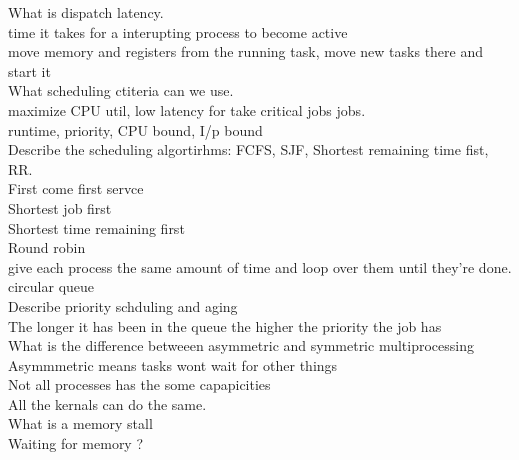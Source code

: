 \documentclass[a4paper,10pt,titlepage]{report}
\begin{document}
What is dispatch latency.\\
\hspace{10mm} time it takes for a interupting process to become active \\
\hspace{10mm} move memory and registers from the running task, move new tasks there and start it \\


What scheduling ctiteria can we use.\\
\hspace{10mm} maximize CPU util, low latency for take critical jobs jobs.\\
\hspace{10mm} runtime, priority, CPU bound, I/p bound \\


Describe the scheduling algortirhms: FCFS, SJF, Shortest remaining time fist, RR.\\
\hspace{10mm} First come first servce\\
\hspace{10mm} Shortest job first \\
\hspace{10mm} Shortest time remaining first \\
\hspace{10mm} Round robin\\
\hspace{10mm}give each process the same amount of time and loop over them until they're done. circular queue\\



Describe priority schduling and aging\\
\hspace{10mm} The longer it has been in the queue the higher the priority the job has\\


What is the difference betweeen asymmetric and symmetric multiprocessing\\
\hspace{10mm} Asymmmetric means tasks wont wait for other things \\
\hspace{10mm} Not all processes has the some capapicities\\
\hspace{10mm} All the kernals can do the same.\\ 


What is a memory stall\\
\hspace{10mm} Waiting for memory ? \\
\end{document}
